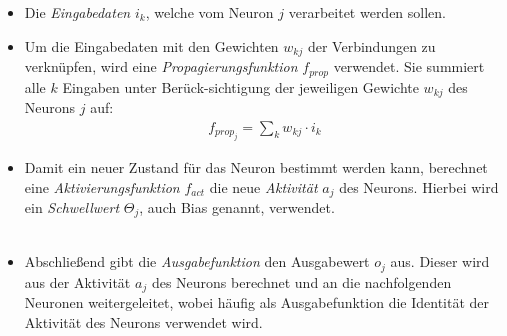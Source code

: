 \documentclass[12pt,a4paper,bibliography=totocnumbered,listof=totocnumbered]{article}
\begin{document}
\begin{itemize}
\item Die \emph{Eingabedaten} $i_{k}$, welche vom Neuron $j$ verarbeitet werden sollen.
\item Um die Eingabedaten mit den Gewichten $w_{kj}$ der Verbindungen zu verknüpfen, wird eine \emph{Propagierungsfunktion} $f_{prop}$ verwendet. Sie summiert alle $k$ Eingaben unter Berück-sichtigung der jeweiligen Gewichte $w_{kj}$ des Neurons $j$ auf: 
\begin{align}
f_{prop_{j}} = \sum_{k}w_{kj} \cdot i_{k}
\end{align}
\item Damit ein neuer Zustand für das Neuron bestimmt werden kann, berechnet eine \emph{Aktivierungsfunktion} $f_{act}$ die neue \emph{Aktivität} $a_{j}$ des Neurons. Hierbei wird ein \emph{Schwellwert} $\Theta_{j}$, auch Bias genannt, verwendet.\\\\
\item Abschließend gibt die \emph{Ausgabefunktion} den Ausgabewert $o_{j}$ aus. Dieser wird aus der Aktivität $a_{j}$ des Neurons berechnet und an die nachfolgenden Neuronen weitergeleitet, wobei häufig als Ausgabefunktion die Identität der Aktivität des Neurons verwendet wird.
\end{itemize}
\end{document}
